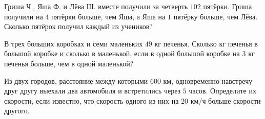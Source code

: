 \begin{class}[number=7]
\begin{listofex}
		\item Гриша Ч., Яша Ф. и Лёва Ш. вместе получили за четверть \( 102 \) пятёрки. Гриша получили на \( 4 \) пятёрки больше, чем Яша, а Яша на \( 1 \) пятёрку больше, чем Лёва. Сколько пятёрок получил каждый из учеников?
		\item В трех больших коробках и семи маленьких \( 49 \) кг печенья. Сколько кг печенья в большой коробке и сколько в маленькой, если в одной большой коробке на \( 3 \) кг печенья больше, чем в одной маленькой?
		\item Из двух городов, расстояние между которыми \( 600 \) км, одновременно навстречу друг другу выехали два автомобиля и встретились через \( 5 \) часов. Определите их скорости, если известно, что скорость одного из них на \( 20 \) км/ч больше скорости другого.
	\end{listofex}
\end{class}


